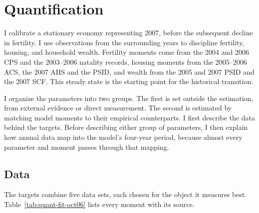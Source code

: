 \providecommand{\mocktodo}[1]{\textcolor{red}{[TODO: #1]}}

\section{Quantification}
\label{sec:quant-oct06}

I calibrate a stationary economy representing 2007, before the subsequent
decline in fertility. I use observations from the surrounding years to
discipline fertility, housing, and household wealth. Fertility moments come
from the 2004 and 2006 CPS and the 2003--2006 natality records, housing moments
from the 2005--2006 ACS, the 2007 AHS and the PSID, and wealth from the 2005
and 2007 PSID and the 2007 SCF. This steady state is the starting point for the
historical transition.

I organize the parameters into two groups. The first is set outside the
estimation, from external evidence or direct measurement. The second is
estimated by matching model moments to their empirical counterparts. I first
describe the data behind the targets. Before describing either group of
parameters, I then explain how annual data map into the model's
four-year period, because almost every parameter and moment passes through
that mapping.

\subsection{Data}
\label{sec:quant-data}

The targets combine five data sets, each chosen for the object it measures
best. Table~\ref{tab:quant-fit-oct06} lists every moment with its source.

